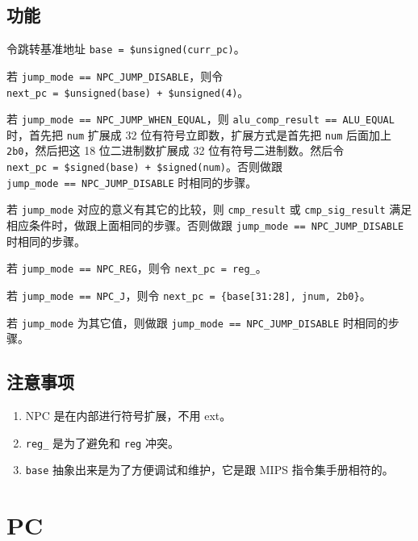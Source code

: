 \documentclass[12pt,AutoFakeBold,AutoFakeSlant]{article}
\providecommand{\tightlist}{%
  \setlength{\itemsep}{0pt}\setlength{\parskip}{0pt}}
\begin{document}
\hypertarget{ux529fux80fd}{%
\subsection{功能}\label{ux529fux80fd}}

令跳转基准地址 \texttt{base\ =\ \$unsigned(curr\_pc)}。

若 \texttt{jump\_mode\ ==\ NPC\_JUMP\_DISABLE}，则令
\texttt{next\_pc\ =\ \$unsigned(base)\ +\ \$unsigned(4)}。

若 \texttt{jump\_mode\ ==\ NPC\_JUMP\_WHEN\_EQUAL}，则
\texttt{alu\_comp\_result\ ==\ ALU\_EQUAL} 时，首先把 \texttt{num}
扩展成 32 位有符号立即数，扩展方式是首先把 \texttt{num} 后面加上
\texttt{2\textquotesingle{}b0}，然后把这 18 位二进制数扩展成 32
位有符号二进制数。然后令
\texttt{next\_pc\ =\ \$signed(base)\ +\ \$signed(num)}。否则做跟
\texttt{jump\_mode\ ==\ NPC\_JUMP\_DISABLE} 时相同的步骤。

若 \texttt{jump\_mode} 对应的意义有其它的比较，则 \texttt{cmp\_result}
或 \texttt{cmp\_sig\_result}
满足相应条件时，做跟上面相同的步骤。否则做跟
\texttt{jump\_mode\ ==\ NPC\_JUMP\_DISABLE} 时相同的步骤。

若 \texttt{jump\_mode\ ==\ NPC\_REG}，则令 \texttt{next\_pc\ =\ reg\_}。

若 \texttt{jump\_mode\ ==\ NPC\_J}，则令
\texttt{next\_pc\ =\ \{base{[}31:28{]},\ jnum,\ 2\textquotesingle{}b0\}}。

若 \texttt{jump\_mode} 为其它值，则做跟
\texttt{jump\_mode\ ==\ NPC\_JUMP\_DISABLE} 时相同的步骤。

\hypertarget{ux6ce8ux610fux4e8bux9879}{%
\subsection{注意事项}\label{ux6ce8ux610fux4e8bux9879}}

\begin{enumerate}
\def\labelenumi{\arabic{enumi}.}
\tightlist
\item
  NPC 是在内部进行符号扩展，不用 ext。
\item
  \texttt{reg\_} 是为了避免和 \texttt{reg} 冲突。
\item
  \texttt{base} 抽象出来是为了方便调试和维护，它是跟 MIPS
  指令集手册相符的。
\end{enumerate}

\hypertarget{pc}{%
\section{PC}\label{pc}}
\end{document}
